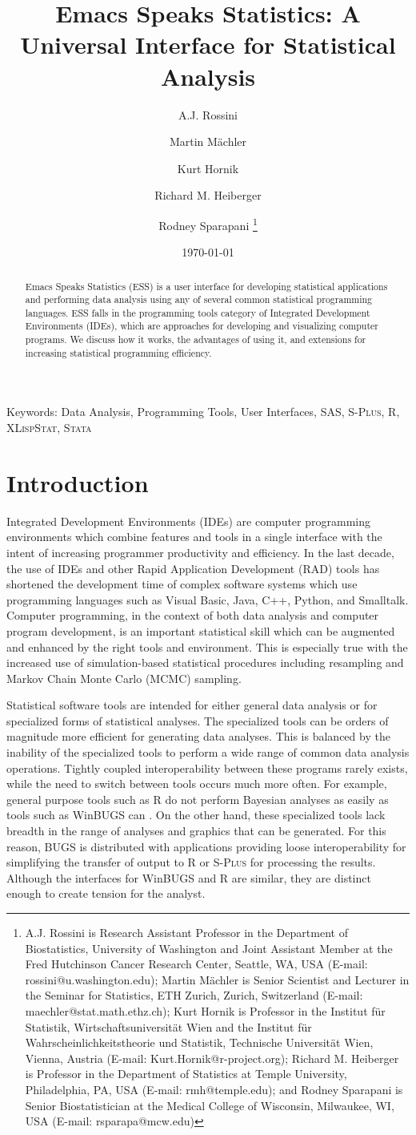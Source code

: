 \documentclass{article}
\title{Emacs Speaks Statistics: A Universal Interface for
  Statistical Analysis}
\author{A.J. Rossini \and Martin M{\"a}chler \and Kurt Hornik \and Richard
  M. Heiberger \and Rodney Sparapani \footnote{%
    A.J. Rossini is Research Assistant Professor in the Department of
    Biostatistics, University of Washington and Joint Assistant Member at
    the Fred Hutchinson Cancer Research Center, Seattle, WA, USA
    (E-mail: rossini@u.washington.edu);
    Martin M{\"a}chler is Senior Scientist and Lecturer in the Seminar for
    Statistics, ETH Zurich, Zurich, Switzerland
    (E-mail: maechler@stat.math.ethz.ch);
    Kurt Hornik is Professor in the Institut f{\"u}r Statistik,
    Wirtschaftsuniversit{\"a}t Wien and the Institut f{\"u}r
    Wahrscheinlichkeitstheorie und Statistik, Technische Universit{\"a}t
    Wien, Vienna, Austria (E-mail: Kurt.Hornik@r-project.org);
    Richard M. Heiberger is Professor in the Department of Statistics at
    Temple University, Philadelphia, PA, USA (E-mail: rmh@temple.edu);
    and Rodney Sparapani is Senior Biostatistician at the Medical College
    of Wisconsin, Milwaukee, WI, USA (E-mail: rsparapa@mcw.edu)}}
\date{\today}
\newcommand*{\Splus}{\textsc{S-Plus}}
\newcommand*{\XLispStat}{\textsc{XLispStat}}
\newcommand*{\Stata}{\textsc{Stata}}
\begin{document}
\maketitle

\begin{abstract}
  Emacs Speaks Statistics (ESS) is a user interface for developing
  statistical applications and performing data analysis using any of
  several common statistical programming languages.  ESS falls in the
  programming tools category of Integrated Development Environments
  (IDEs), which are approaches for developing and visualizing computer
  programs.  We discuss how it works, the advantages of using it, and
  extensions for increasing statistical programming efficiency.
\end{abstract}

Keywords: Data Analysis, Programming Tools, User Interfaces, SAS,
\Splus, R, \XLispStat, \Stata

\baselineskip=2pc

\section{Introduction}
\label{sec:intro}

Integrated Development Environments (IDEs) are computer programming
environments which combine features and tools in a single interface
with the intent of increasing programmer productivity and efficiency.
In the last decade, the use of IDEs and other Rapid Application
Development (RAD) tools has shortened the development time of complex
software systems which use programming languages such as Visual Basic,
Java, C++, Python, and Smalltalk.  Computer programming, in the
context of both data analysis and computer program development, is an
important statistical skill which can be augmented and enhanced by the
right tools and environment.  This is especially true with the
increased use of simulation-based statistical procedures including
resampling and Markov Chain Monte Carlo (MCMC) sampling.

Statistical software tools are intended for either general data
analysis or for specialized forms of statistical analyses.  The
specialized tools can be orders of magnitude more efficient for
generating data analyses.  This is balanced by the inability of the
specialized tools to perform a wide range of common data analysis
operations.  Tightly coupled interoperability between these programs
rarely exists, while the need to switch between tools occurs much more
often.  For example, general purpose tools such as R
\citep{ihak:gent:1996} do not perform Bayesian analyses as easily as
tools such as WinBUGS can \citep{SpieThomBest:1999}.  On the other
hand, these specialized tools lack breadth in the range of analyses
and graphics that can be generated.  For this reason, BUGS is
distributed with applications providing loose interoperability for
simplifying the transfer of output to R or \Splus{} for processing the
results.  Although the interfaces for WinBUGS and R are similar, they
are distinct enough to create tension for the analyst.
\end{document}
